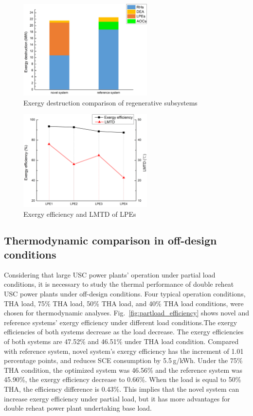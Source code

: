 \documentclass[preprint,12pt]{elsarticle}
\begin{document}
\begin{figure}[htbp]
\centering
\includegraphics[width=0.6\textwidth]{fig/regenerative_subsys_compare.png}
\caption{Exergy destruction comparison of regenerative subsystems} 
\label{fig:regenerative_subsys_compare}
\end{figure}



\begin{figure}[htbp]
\centering
\includegraphics[width=0.6\textwidth]{fig/LPE_exergy_LMTD.png}
\caption{Exergy efficiency and LMTD of LPEs} 
\label{fig:LPE_exergy_LMDT}
\end{figure}

\subsection{Thermodynamic comparison in off-design conditions}
\label{ssub:offdesing_compare}
Considering that large USC power plants' operation under partial load conditions, it is necessary to study the thermal performance of double reheat USC power plants under off-design conditions.
Four typical operation conditions, THA load, 75\% THA load, 50\% THA load, and 40\% THA load conditions, were chosen for thermodynamic analyses. 
Fig.~\ref{fig:partload_efficiency} shows novel and reference systems' exergy efficiency under different load conditions.The exergy efficiencies of both systems decrease as the load decrease.
The exergy efficiencies of both systems are 47.52\% and 46.51\% under THA load condition. Compared with reference system, novel system's exergy efficiency has the increment of 1.01 percentage points, and reduces SCE consumption by 5.5\,g/kWh.
Under the 75\% THA condition, the optimized system was 46.56\% and the reference system was 45.90\%, the exergy
efficiency decrease to 0.66\%. 
When the load is equal to 50\% THA, the efficiency difference is 0.43\%.
This implies that the novel system can increase exergy efficiency under partial load, but it has more advantages for double reheat power plant undertaking base load.
\end{document}
